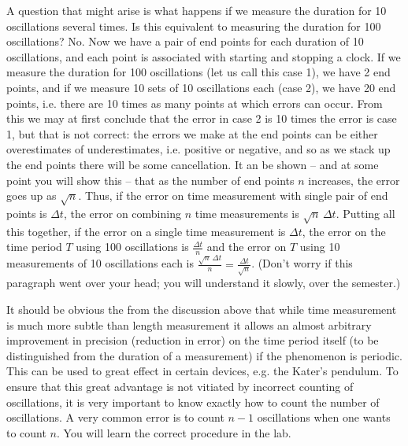 A question that might arise is what happens if we measure the duration for 10 oscillations several times. Is this equivalent to measuring the duration for 100 oscillations? No. Now we have a pair of end points for each duration of 10 oscillations, and each point is associated with starting and stopping a clock. If we measure the duration for 100 oscillations (let us call this case 1), we have 2 end points, and if we measure 10 sets of 10 oscillations each (case 2), we have 20 end points, i.e. there are 10 times as many points at which errors can occur. From this we may at first conclude that the error in case 2 is 10 times the error is case 1, but that is not correct: the errors we make at the end points can be either overestimates of underestimates, i.e. positive or negative, and so as we stack up the end points there will be some cancellation. It an be shown -- and at some point you will show this -- that as the number of end points $n$ increases, the error goes up as $\sqrt{n}$. Thus, if the error on time measurement with single pair of end points is $\Delta t$, the error on combining $n$ time measurements is $\sqrt{n} \, \Delta t$. Putting all this together, if the error on a single time measurement is $\Delta t$, the error on the time period $T$ using 100 oscillations is $\frac{\Delta t}{n}$ and the error on $T$ using 10 measurements of 10 oscillations each is $\frac{\sqrt{n} \, \Delta t}{n} = \frac{\Delta t}{\sqrt{n}}$. (Don't worry if this paragraph went over your head; you will understand it slowly, over the semester.)

It should be obvious the from the discussion above that while time measurement is much more subtle than length measurement it allows an almost arbitrary improvement in precision (reduction in error) on the time period itself (to be distinguished from the duration of a measurement)  if the phenomenon is periodic. This can be used to great effect in certain devices, e.g. the Kater's pendulum. To ensure that this great advantage is not vitiated by incorrect counting of oscillations, it is very important to know exactly how to count the number of oscillations. A very common error is to count $n-1$ oscillations when one wants to count $n$. You will learn the correct procedure in the lab. 



